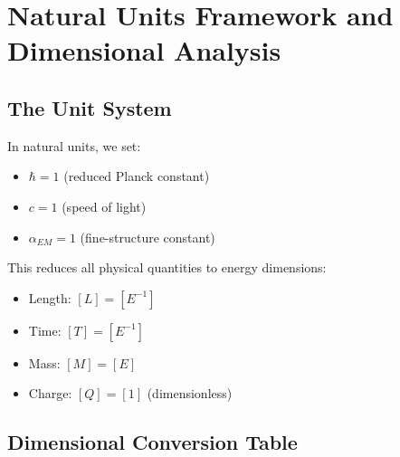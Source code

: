 \documentclass[12pt,a4paper]{article}
\begin{document}
	\tableofcontents
	\newpage
	
	\section{Natural Units Framework and Dimensional Analysis}
	\label{sec:natural_units}
	
	\subsection{The Unit System}
	\label{subsec:unit_system}
	
	In natural units, we set:
	\begin{itemize}
		\item $\hbar = 1$ (reduced Planck constant)
		\item $c = 1$ (speed of light)
		\item $\alpha_{EM} = 1$ (fine-structure constant)
	\end{itemize}
	
	This reduces all physical quantities to energy dimensions:
	
	\begin{tcolorbox}[colback=blue!5!white,colframe=blue!75!black,title=Dimensions in Natural Units]
		\begin{itemize}
			\item Length: $[L] = [E^{-1}]$
			\item Time: $[T] = [E^{-1}]$ 
			\item Mass: $[M] = [E]$
			\item Charge: $[Q] = [1]$ (dimensionless)
		\end{itemize}
	\end{tcolorbox}
	
	\subsection{Dimensional Conversion Table}
	
\end{document}
